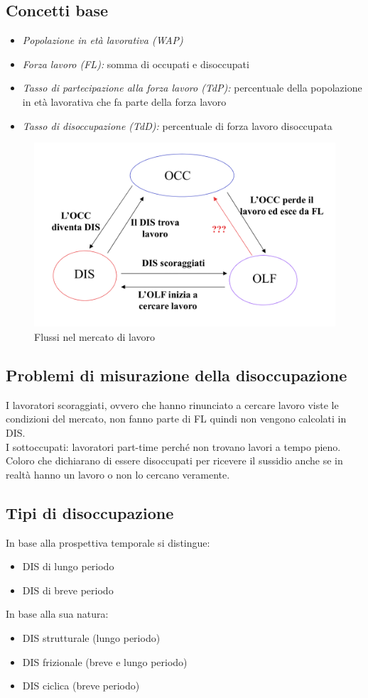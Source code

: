 \documentclass{report}
\begin{document}
	\subsection{Concetti base}
	\begin{itemize}
		\item \textit{Popolazione in età lavorativa (WAP)}
		\item \textit{Forza lavoro (FL):} somma di occupati e disoccupati
		\item \textit{Tasso di partecipazione alla forza lavoro (TdP):} percentuale della popolazione in età lavorativa che fa parte della forza lavoro
		\item \textit{Tasso di disoccupazione (TdD):} percentuale di forza lavoro disoccupata
	\end{itemize}
	\begin{figure}[h]
		\centering
		\includegraphics[width=0.7\linewidth]{flussi-mercato-lavoro}
		\caption{Flussi nel mercato di lavoro}
		\label{fig:flussi-mercato-lavoro}
	\end{figure}
	\subsection{Problemi di misurazione della disoccupazione}
	I lavoratori scoraggiati, ovvero che hanno rinunciato a cercare lavoro viste le condizioni del mercato, non fanno parte di FL quindi non vengono calcolati in DIS.
	\medskip \\I sottoccupati: lavoratori part-time perché non trovano lavori a tempo pieno.
	\medskip \\Coloro che dichiarano di essere disoccupati per ricevere il sussidio anche se in realtà hanno un lavoro o non lo cercano veramente.
	\subsection{Tipi di disoccupazione}
	In base alla prospettiva temporale si distingue:
	\begin{itemize}
		\item DIS di lungo periodo
		\item DIS di breve periodo
	\end{itemize}
	In base alla sua natura:
	\begin{itemize}
		\item DIS strutturale (lungo periodo)
		\item DIS frizionale (breve e lungo periodo)
		\item DIS ciclica (breve periodo)
	\end{itemize}
\end{document}
